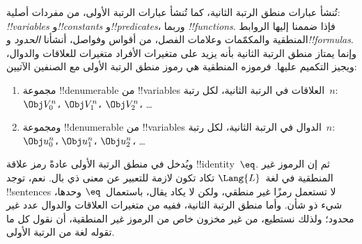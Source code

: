 \documentclass[../../../include/open-logic-section]{subfiles}
\begin{document}


تُنشأ عبارات منطق الرتبة الثانية، كما تُنشأ عبارات الرتبة الأولى، من
مفردات أصلية: \emph{!!{variable}s} و\emph{!!{constant}s}
و\emph{!!{predicate}s}، وربما \emph{!!{function}s}. فإذا ضممنا إليها
الروابط المنطقية والمكمّمات وعلامات الفصل، من أقواس وفواصل، أنشأنا
\emph{الحدود} و\emph{!!{formula}s}. وإنما يمتاز منطق الرتبة الثانية بأنه
يزيد على متغيرات الأفراد متغيرات للعلاقات والدوال، ويجيز التكميم عليها.
فرموزه المنطقية هي رموز منطق الرتبة الأولى مع الصنفين الآتيين:

\begin{enumerate}
\item مجموعة !!{denumerable} من !!{variable}s العلاقات في الرتبة الثانية،
  لكل رتبة~$n$: $\Obj V_0^n$، $\Obj V_1^n$، $\Obj V_2^n$، \dots
\item ومجموعة !!{denumerable} من !!{variable}s الدوال في الرتبة الثانية،
  لكل رتبة~$n$: $\Obj u_0^n$، $\Obj u_1^n$، $\Obj u_2^n$، \dots
\end{enumerate}

ويُدخل في منطق الرتبة الأولى عادةً رمز علاقة !!{identity}~$\eq$. ثم إن
الرموز غير المنطقية في لغة~$\Lang{L}$ تكاد تكون لازمة للتعبير عن معنى
ذي بال. نعم، توجد !!{sentence}s لا تستعمل رمزًا غير منطقي، ولكن لا يكاد
يقال، باستعمال~$\eq$ وحدها، شيء ذو شأن. وأما منطق الرتبة الثانية، ففيه
من متغيرات العلاقات والدوال عدد غير محدود؛ ولذلك نستطيع، من غير مخزون
خاص من الرموز غير المنطقية، أن نقول كل ما تقوله لغة من الرتبة الأولى.
\end{document}
